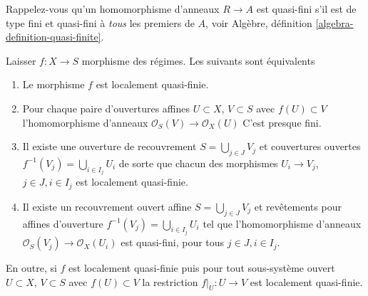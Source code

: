 \noindent
Rappelez-vous qu'un homomorphisme d'anneaux $R \to A$ est quasi-fini s'il est de type fini et quasi-fini à {\it tous} les premiers de $A$, voir Algèbre, définition \ref{algebra-definition-quasi-finite}.

\begin{lemma}

\label{lemma-locally-quasi-finite-characterize}

Laisser $f : X \to S$ morphisme des régimes. Les suivants sont équivalents

\begin{enumerate}

\item Le morphisme $f$ est localement quasi-finie.
\item Pour chaque paire d'ouvertures affines $U \subset X$, $V \subset S$
avec $f(U) \subset V$ l'homomorphisme d'anneaux
$\mathcal{O}_S(V) \to \mathcal{O}_X(U)$ C'est presque fini.
\item Il existe une ouverture de recouvrement $S = \bigcup_{j \in J} V_j$
et couvertures ouvertes $f^{-1}(V_j) = \bigcup_{i \in I_j} U_i$ de sorte que chacun des morphismes $U_i \to V_j$, $j\in J, i\in I_j$
est localement quasi-finie.
\item Il existe un recouvrement ouvert affine $S = \bigcup_{j \in J} V_j$
et revêtements pour affines d'ouverture $f^{-1}(V_j) = \bigcup_{i \in I_j} U_i$ tel que l'homomorphisme d'anneaux $\mathcal{O}_S(V_j) \to \mathcal{O}_X(U_i)$ est quasi-fini, pour tous $j\in J, i\in I_j$.

\end{enumerate}

En outre, si $f$ est localement quasi-finie puis pour tout sous-système ouvert $U \subset X$, $V \subset S$ avec $f(U) \subset V$
la restriction $f|_U : U \to V$ est localement quasi-finie.

\end{lemma}

